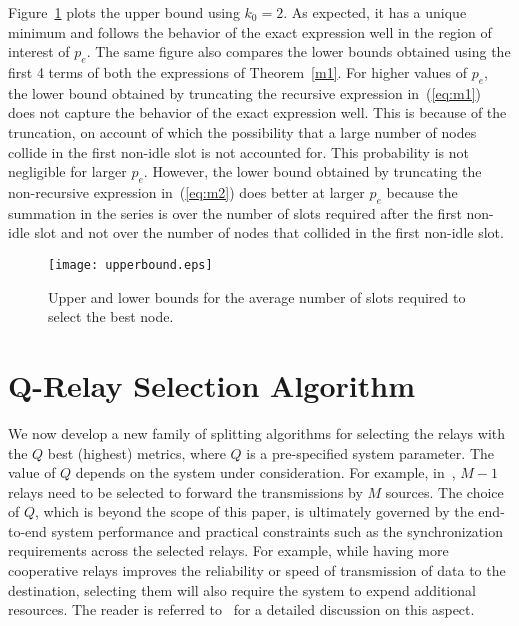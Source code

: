 \documentclass[12pt,draftcls,peerreview, onecolumn]{IEEEtran}
\newcommand{\eqn}[1]{(\ref{#1})}
\begin{document}
Figure~\ref{fig:upperbounds} plots the upper bound using $k_0 = 2$. As
expected, it has a unique minimum and follows the behavior of the
exact expression well in the region of interest of $p_e$.  The same
figure also compares the lower bounds obtained using the first 4 terms
of both the expressions of Theorem~\ref{m1}.  For higher values of
$p_e$, the lower bound obtained by truncating the recursive expression
in~\eqn{eq:m1} does not capture the behavior of the exact expression
well. This is because of the truncation, on account of which
the possibility that a large number of nodes collide in the first non-idle
slot is not accounted for. This probability is not negligible for
larger $p_e$.  However, the lower bound obtained by truncating the
non-recursive expression in~\eqn{eq:m2} does better at larger $p_e$
because the summation in the series is over the number of slots
required after the first non-idle slot and not over the number of
nodes that collided in the first non-idle slot.

\begin{figure}
  \centering \texttt{[image: upperbound.eps]}
                \caption{Upper and lower bounds for the average number of slots required to select the best node.}
        \label{fig:upperbounds}
\end{figure}


\section{Q-Relay Selection Algorithm}
\label{sec:Q-Relay Selection Algorithm}

We now develop a new family of splitting algorithms for selecting the
relays with the $Q$ best (highest) metrics, where $Q$ is a
pre-specified system parameter. The value of $Q$ depends on the system
under consideration. For example, in~\cite{ding_TWC_2009}, $M-1$
relays need to be selected to forward the transmissions by $M$
sources.  The choice of $Q$, which is beyond the scope of this paper,
is ultimately governed by the end-to-end system performance and
practical constraints such as the synchronization requirements across
the selected relays. For example, while having more cooperative relays
improves the reliability or speed of transmission of data to the
destination, selecting them will also require the system to expend
additional resources. The reader is referred
to~\cite{nam_CISS_2008,madan_TWC_2008,lo_VT_2009_SubsetSelection,shah_globecom_2009}
for a detailed discussion on this aspect.
\end{document}
